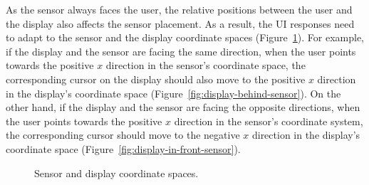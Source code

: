 As the sensor always faces the user, the relative positions between the user
and the display also affects the sensor placement. As a result, the UI responses
need to adapt to the sensor and the display coordinate spaces
(Figure~\ref{fig:coordinate}).
For example, if the display and the sensor are facing the same direction, when the user points towards the positive $x$ direction in the
sensor's coordinate space, the corresponding cursor on the display should also
move to the positive $x$ direction in the display's coordinate space 
(Figure~\ref{fig:display-behind-sensor}).
On the other hand, if the display and the sensor are facing the opposite
directions, when the user points towards the positive $x$ direction in the
sensor's coordinate system, the corresponding cursor should move to the negative
$x$ direction in the display's coordinate space
(Figure~\ref{fig:display-in-front-sensor}).

\begin{figure}[tbh]
\centering
{}
\caption{Sensor and display coordinate spaces.}\label{fig:coordinate}
\end{figure}

